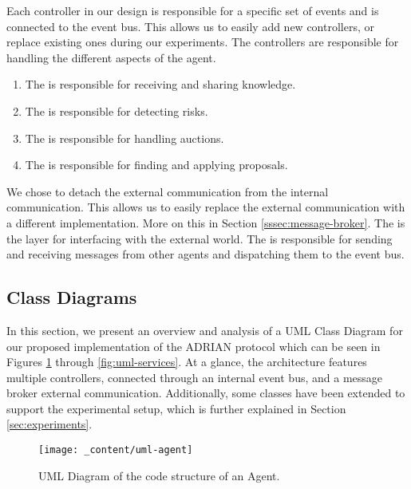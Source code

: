 Each controller in our design is responsible for a specific set of events and is connected to the event bus. This allows us to easily add new controllers, or replace existing ones during our experiments. The controllers are responsible for handling the different aspects of the agent. 

\begin{enumerate}
    \item The  is responsible for receiving and sharing knowledge. 
    \item The  is responsible for detecting risks.
    \item The  is responsible for handling auctions. 
    \item The  is responsible for finding and applying proposals.
\end{enumerate}

We chose to detach the external communication from the internal communication. This allows us to easily replace the external communication with a different implementation. More on this in Section \ref{sssec:message-broker}.
The  is the layer for interfacing with the external world. The  is responsible for sending and receiving messages from other agents and dispatching them to the event bus.

\subsection{Class Diagrams}
\label{ssec:class-diagrams}

In this section, we present an overview and analysis of a UML Class Diagram for our proposed implementation of the ADRIAN protocol \cite{mann2023ADRIAN} which can be seen in Figures \ref{fig:uml-agent} through \ref{fig:uml-services}. At a glance, the architecture features multiple controllers, connected through an internal event bus, and a message broker external communication. Additionally, some classes have been extended to support the experimental setup, which is further explained in Section \ref{sec:experiments}.

\begin{figure}[H]
    \centering
    \texttt{[image: \_content/uml-agent]}
    \caption{UML Diagram of the code structure of an Agent.}
    \label{fig:uml-agent}
\end{figure}

